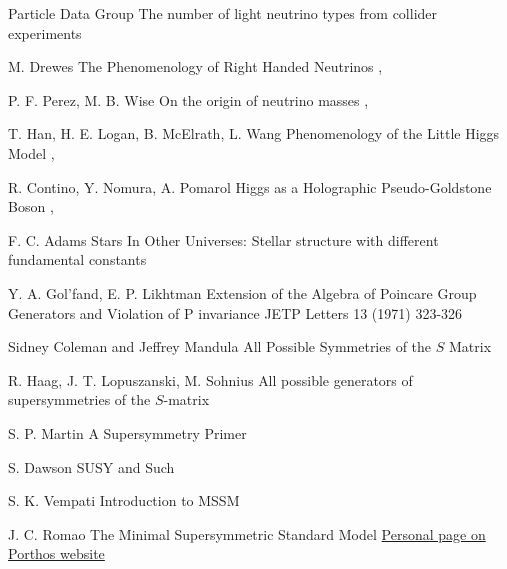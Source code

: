{Particle Data Group}
{The number of light neutrino types from collider experiments}
{}

{M. Drewes}
{The Phenomenology of Right Handed Neutrinos}
{, }

{P. F. Perez, M. B. Wise}
{On the origin of neutrino masses}
{, }

{T. Han, H. E. Logan, B. McElrath, L. Wang}
{Phenomenology of the Little Higgs Model}
{, }

{R. Contino, Y. Nomura, A. Pomarol}
{Higgs as a Holographic Pseudo-Goldstone Boson}
{, }

{F. C. Adams}
{Stars In Other Universes: Stellar structure with different fundamental constants}
{}

{Y. A. Gol'fand, E. P. Likhtman}
{Extension of the Algebra of Poincare Group Generators and Violation of P invariance}
{JETP Letters 13 (1971) 323-326}

{Sidney Coleman and Jeffrey Mandula}
{All Possible Symmetries of the $S$ Matrix}
{}

{R. Haag, J. T. Lopuszanski, M. Sohnius}
{All possible generators of supersymmetries of the $S$-matrix}
{}

{S. P. Martin}
{A Supersymmetry Primer}
{}

{S. Dawson}
{SUSY and Such}
{}

{S. K. Vempati}
{Introduction to MSSM}
{}

{J. C. Romao}
{The Minimal Supersymmetric Standard Model}
{\href{http://porthos.ist.utl.pt/~romao/homepage/publications/}{Personal page on Porthos website}}


